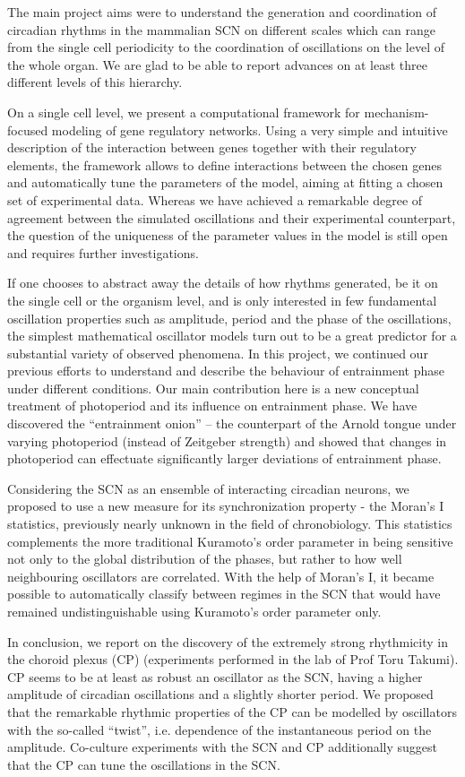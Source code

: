 The main project aims were to understand the generation and
coordination of circadian rhythms in the mammalian SCN on different
scales which can range from the single cell periodicity to the
coordination of oscillations on the level of the whole organ. We are
glad to be able to report advances on at least three different levels
of this hierarchy.

On a single cell level, we present a computational framework for
mechanism-focused modeling of gene regulatory networks. Using a very
simple and intuitive description of the interaction between genes
together with their regulatory elements, the framework allows to
define interactions between the chosen genes and automatically tune
the parameters of the model, aiming at fitting a chosen set of
experimental data.  Whereas we have achieved a remarkable degree of
agreement between the simulated oscillations and their experimental
counterpart, the question of the uniqueness of the parameter values in
the model is still open and requires further investigations.

If one chooses to abstract away the details of how rhythms generated,
be it on the single cell or the organism level, and is only interested
in few fundamental oscillation properties such as amplitude, period
and the phase of the oscillations, the simplest mathematical
oscillator models turn out to be a great predictor for a substantial
variety of observed phenomena. In this project, we continued our
previous efforts to understand and describe the behaviour of
entrainment phase under different conditions. Our main contribution
here is a new conceptual treatment of photoperiod and its influence on
entrainment phase. We have discovered the ``entrainment onion'' \---
the counterpart of the Arnold tongue under varying photoperiod
(instead of Zeitgeber strength) and showed that changes in photoperiod
can effectuate significantly larger deviations of entrainment phase.

Considering the SCN as an ensemble of interacting circadian neurons,
we proposed to use a new measure for its synchronization property -
the Moran's I statistics, previously nearly unknown in the field of
chronobiology. This statistics complements the more traditional
Kuramoto's order parameter in being sensitive not only to the global
distribution of the phases, but rather to how well neighbouring
oscillators are correlated. With the help of Moran's I, it became
possible to automatically classify between regimes in the SCN that
would have remained undistinguishable using Kuramoto's order parameter
only.

In conclusion, we report on the discovery of the extremely strong
rhythmicity in the choroid plexus (CP) (experiments performed in the
lab of Prof Toru Takumi). CP seems to be at least as robust an
oscillator as the SCN, having a higher amplitude of circadian
oscillations and a slightly shorter period. We proposed that the
remarkable rhythmic properties of the CP can be modelled by
oscillators with the so-called ``twist'', i.e. dependence of the
instantaneous period on the amplitude. Co-culture experiments with the
SCN and CP additionally suggest that the CP can tune the oscillations
in the SCN.

